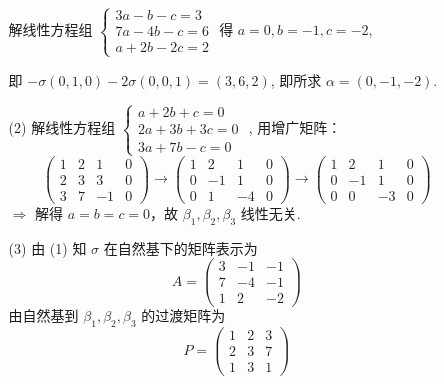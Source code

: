 \documentclass{ctexbook}
\begin{document}
\begin{enumerate}
\begin{enumerate}
        解线性方程组 \(\begin{cases}
            3a-b-c=3\\
            7a-4b-c=6\\
            a+2b-2c=2
            \end{cases}\) 得 \(a=0,b=-1,c=-2\), \par
            即 \(-\sigma(0,1,0)-2\sigma(0,0,1)=(3,6,2)\), 即所求 \(\alpha=(0,-1,-2)\).
        \item[(2)] 解线性方程组 \(\begin{cases}
            a+2b+c=0\\
            2a+3b+3c=0\\
            3a+7b-c=0
            \end{cases}\) , 用增广矩阵：
            \[
            \left(\begin{array}{ccc|c}
            1 & 2 & 1 & 0 \\
            2 & 3 & 3 & 0 \\
            3 & 7 & -1 & 0
            \end{array}\right) \to
            \left(\begin{array}{ccc|c}
            1 & 2 & 1 & 0 \\
            0 & -1 & 1 & 0 \\
            0 & 1 & -4 & 0
            \end{array}\right) \to
            \left(\begin{array}{ccc|c}
            1 & 2 & 1 & 0 \\
            0 & -1 & 1 & 0 \\
            0 & 0 & -3 & 0
            \end{array}\right)
            \] \(\Rightarrow\) 解得 \(a=b=c=0\)，故 \(\beta_1,\beta_2,\beta_3\) 线性无关.
        \item[(3)] 由 (1) 知 \(\sigma\) 在自然基下的矩阵表示为
        \[
        A=\begin{pmatrix}
            3 & -1 & -1\\
            7 & -4 & -1\\
            1 & 2 & -2
        \end{pmatrix}
        \]
        由自然基到 \(\beta_1,\beta_2,\beta_3\) 的过渡矩阵为
        \[
        P=\begin{pmatrix}
            1 & 2 & 3\\
            2 & 3 & 7\\
            1 & 3 & 1
        \end{pmatrix}
\]
\end{enumerate}
\end{enumerate}
\end{document}
